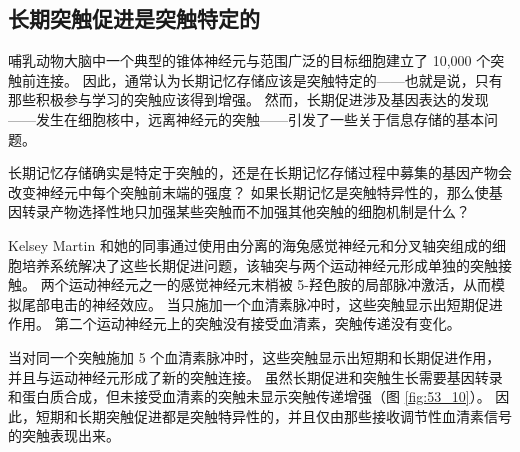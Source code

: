 \subsection{长期突触促进是突触特定的}

哺乳动物大脑中一个典型的锥体神经元与范围广泛的目标细胞建立了 10,000 个突触前连接。
因此，通常认为长期记忆存储应该是突触特定的——也就是说，只有那些积极参与学习的突触应该得到增强。
然而，长期促进涉及基因表达的发现——发生在细胞核中，远离神经元的突触——引发了一些关于信息存储的基本问题。


长期记忆存储确实是特定于突触的，还是在长期记忆存储过程中募集的基因产物会改变神经元中每个突触前末端的强度？
如果长期记忆是突触特异性的，那么使基因转录产物选择性地只加强某些突触而不加强其他突触的细胞机制是什么？


Kelsey Martin 和她的同事通过使用由分离的海兔感觉神经元和分叉轴突组成的细胞培养系统解决了这些长期促进问题，该轴突与两个运动神经元形成单独的突触接触。
两个运动神经元之一的感觉神经元末梢被 5-羟色胺的局部脉冲激活，从而模拟尾部电击的神经效应。
当只施加一个血清素脉冲时，这些突触显示出短期促进作用。
第二个运动神经元上的突触没有接受血清素，突触传递没有变化。


当对同一个突触施加 5 个血清素脉冲时，这些突触显示出短期和长期促进作用，并且与运动神经元形成了新的突触连接。
虽然长期促进和突触生长需要基因转录和蛋白质合成，但未接受血清素的突触未显示突触传递增强（图 \ref{fig:53_10}）。
因此，短期和长期突触促进都是突触特异性的，并且仅由那些接收调节性血清素信号的突触表现出来。


